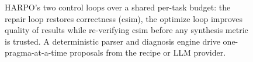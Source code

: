 \begin{figure}[t]
\caption{HARPO's two control loops over a shared per-task budget: the repair loop restores correctness (csim), the optimize loop improves quality of results while re-verifying csim before any synthesis metric is trusted. A deterministic parser and diagnosis engine drive one-pragma-at-a-time proposals from the recipe or LLM provider.}
\label{fig:arch}
\end{figure}
